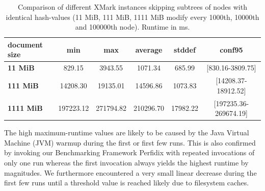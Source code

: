\begin{table}[tb]
\centering 
\begin{tabular}[r]{|l|c|c|c|c|c|} 
\hline
\textbf{document size} & \textbf{min} & \textbf{max} & \textbf{average} & \textbf{stddef} & \textbf{conf95}\\
\hline
\hline
\textbf{11 MiB} & 829.15 & 3943.55 & 1071.34 & 685.99 & [830.16-3809.75] \\
\hline
\textbf{111 MiB} & 14208.30 & 19135.01 & 14596.86 & 1073.83 & [14208.37-18912.52]\\
\hline
\textbf{1111 MiB} & 197223.12  & 271794.82 & 210296.70 & 17982.22 & [197235.36-269674.19]\\
\hline
\end{tabular}
\label{chap3:compPrunedDiffInstances}
\vspace{0.5em} 
\caption{Comparison of different XMark instances skipping subtrees of nodes with identical hash-values (11 MiB, 111 MiB, 1111 MiB modify every 1000th, 10000th and 100000th node). Runtime in ms.}
\end{table}


The high maximum-runtime values are likely to be caused by the Java Virtual Machine (JVM) warmup during the first or first few runs. This is also confirmed by invoking our Benchmarking Framework Perfidix with repeated invocations of only one run whereas the first invocation always yields the highest runtime by magnitudes. We furthermore encountered a very small linear decrease during the first few runs until a threshold value is reached likely due to filesystem caches.

